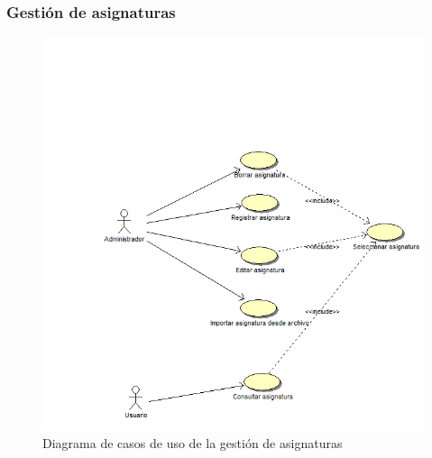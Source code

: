 \documentclass{book}
\begin{document}
\subsubsection{Gestión de asignaturas}
\begin{figure}[H] 
  \label{gestion-asignaturas} 
	\begin{center}
    \includegraphics[scale=0.5]{./gestionasignaturas.png}
  \end{center}
\caption{Diagrama de casos de uso de la gestión de asignaturas}
\end{figure}
\end{document}
